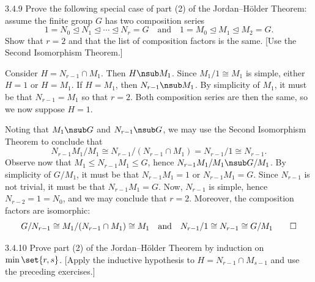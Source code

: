 \begin{exercise}{3.4.9}
    Prove the following special case of part (2) of the Jordan--H\"older Theorem: assume the finite group $G$ has two composition series
    \[
    	 1 = N_0 \trianglelefteq N_1 \trianglelefteq \cdots \trianglelefteq N_r = G \quad\text{and}\quad 1 = M_0 \trianglelefteq M_1 \trianglelefteq M_2 = G. 
    \]
    Show that $r = 2$ and that the list of composition factors is the same. [Use the Second Isomorphism Theorem.]
\end{exercise}

\begin{sol}
    Consider $H = N_{r - 1} \cap M_1$.
	Then $H \nsub M_1$.
	Since $M_1/1 \cong M_1$ is simple, either $H = 1$ or $H = M_1$.
	If $H = M_1$, then $N_{r - 1} \nsub M_1$.
	By simplicity of $M_1$, it must be that $N_{r - 1} = M_1$ so that $r = 2$.
	Both composition series are then the same, so we now suppose $H = 1$.

    Noting that $M_1 \nsub G$ and $N_{r - 1} \nsub G$, we may use the Second Isomorphism Theorem to conclude that
    \[
    	N_{r - 1}M_1/M_1 \cong N_{r - 1}/(N_{r - 1} \cap M_1) = N_{r - 1}/1 \cong N_{r - 1}.
    \]
	Observe now that $M_1 \leq N_{r - 1}M_1 \leq G$, hence $N_{r - 1}M_1/M_1 \nsub G/M_1$.
	By simplicity of $G/M_1$, it must be that $N_{r - 1}M_1 = 1$ or $N_{r - 1}M_1 = G$.
	Since $N_{r - 1}$ is not trivial, it must be that $N_{r - 1}M_1 = G$.
	Now, $N_{r - 1}$ is simple, hence $N_{r - 2} = 1 = N_0$, and we may conclude that $r = 2$.
	Moreover, the composition factors are isomorphic:
    \[
    	G/N_{r - 1} \cong M_1/(N_{r - 1} \cap M_1) \cong M_1 \quad \text{and} \quad N_{r - 1}/1 \cong N_{r - 1} \cong G/M_1 \qedhere
    \]
\end{sol}

\begin{exercise}{3.4.10}
    Prove part (2) of the Jordan--H\"older Theorem by induction on $\min\set{r,s}$. [Apply the inductive hypothesis to $H = N_{r-1} \cap M_{s-1}$ and use the preceding exercises.]
\end{exercise}

